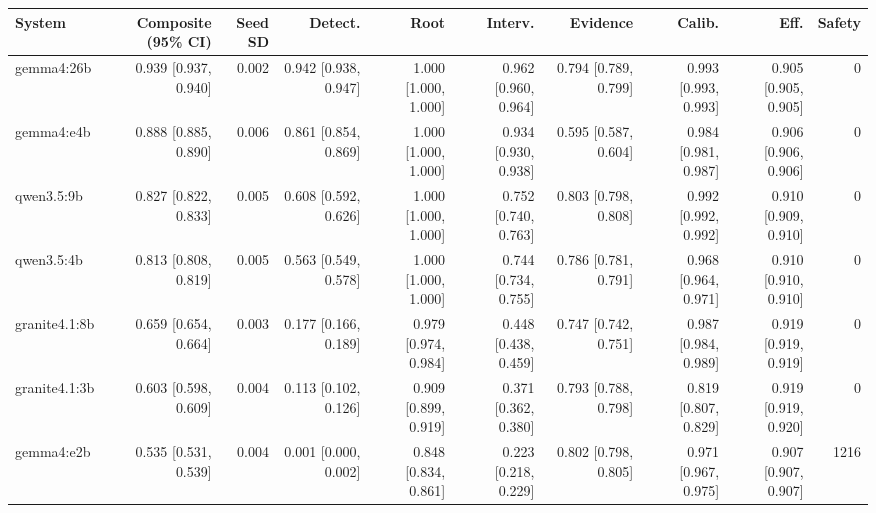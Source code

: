 \begin{tabular}{lrrrrrrrrr}
\toprule
System & Composite (95\% CI) & Seed SD & Detect. & Root & Interv. & Evidence & Calib. & Eff. & Safety \\
\midrule
gemma4:26b & 0.939 [0.937, 0.940] & 0.002 & 0.942 [0.938, 0.947] & 1.000 [1.000, 1.000] & 0.962 [0.960, 0.964] & 0.794 [0.789, 0.799] & 0.993 [0.993, 0.993] & 0.905 [0.905, 0.905] & 0 \\
gemma4:e4b & 0.888 [0.885, 0.890] & 0.006 & 0.861 [0.854, 0.869] & 1.000 [1.000, 1.000] & 0.934 [0.930, 0.938] & 0.595 [0.587, 0.604] & 0.984 [0.981, 0.987] & 0.906 [0.906, 0.906] & 0 \\
qwen3.5:9b & 0.827 [0.822, 0.833] & 0.005 & 0.608 [0.592, 0.626] & 1.000 [1.000, 1.000] & 0.752 [0.740, 0.763] & 0.803 [0.798, 0.808] & 0.992 [0.992, 0.992] & 0.910 [0.909, 0.910] & 0 \\
qwen3.5:4b & 0.813 [0.808, 0.819] & 0.005 & 0.563 [0.549, 0.578] & 1.000 [1.000, 1.000] & 0.744 [0.734, 0.755] & 0.786 [0.781, 0.791] & 0.968 [0.964, 0.971] & 0.910 [0.910, 0.910] & 0 \\
granite4.1:8b & 0.659 [0.654, 0.664] & 0.003 & 0.177 [0.166, 0.189] & 0.979 [0.974, 0.984] & 0.448 [0.438, 0.459] & 0.747 [0.742, 0.751] & 0.987 [0.984, 0.989] & 0.919 [0.919, 0.919] & 0 \\
granite4.1:3b & 0.603 [0.598, 0.609] & 0.004 & 0.113 [0.102, 0.126] & 0.909 [0.899, 0.919] & 0.371 [0.362, 0.380] & 0.793 [0.788, 0.798] & 0.819 [0.807, 0.829] & 0.919 [0.919, 0.920] & 0 \\
gemma4:e2b & 0.535 [0.531, 0.539] & 0.004 & 0.001 [0.000, 0.002] & 0.848 [0.834, 0.861] & 0.223 [0.218, 0.229] & 0.802 [0.798, 0.805] & 0.971 [0.967, 0.975] & 0.907 [0.907, 0.907] & 1216 \\
\bottomrule
\end{tabular}
